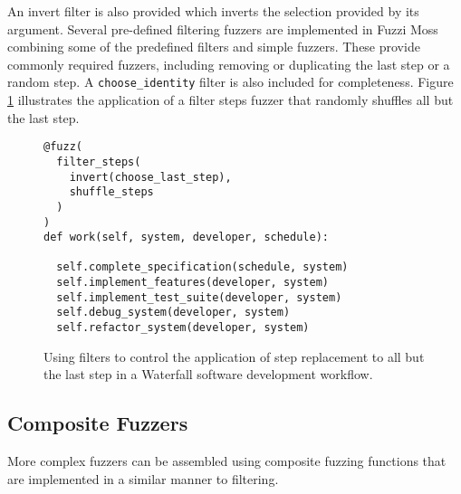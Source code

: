 \documentclass{sig-alternate}
\begin{document}
An invert filter is also provided which inverts the selection provided by its
argument. Several pre-defined filtering fuzzers are implemented in Fuzzi Moss
combining some of the predefined filters and simple fuzzers.  These provide
commonly required fuzzers, including removing or duplicating the last step or a
random step. A \lstinline!choose_identity! filter is also included for
completeness.  Figure \ref{fig:filter} illustrates the application of a filter
steps fuzzer that randomly shuffles all but the last step.

\begin{figure}
  \centering

\begin{lstlisting}
@fuzz(
  filter_steps(
    invert(choose_last_step),
    shuffle_steps
  )
)
def work(self, system, developer, schedule):

  self.complete_specification(schedule, system)
  self.implement_features(developer, system)
  self.implement_test_suite(developer, system)
  self.debug_system(developer, system)
  self.refactor_system(developer, system)

\end{lstlisting}

\caption{Using filters to control the application of step replacement to all but
  the last step in a Waterfall software development workflow.}
  \label{fig:filter}
\end{figure}


\subsection{Composite Fuzzers}


More complex fuzzers can be assembled using composite fuzzing functions that are
implemented in a similar manner to filtering.  
\end{document}
